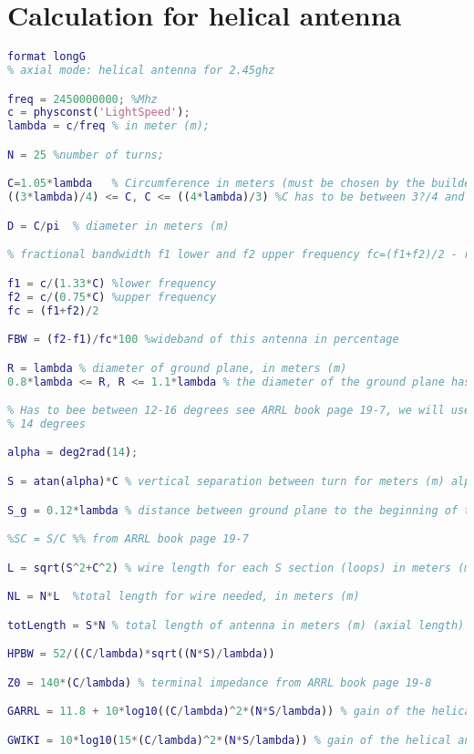 \chapter{Calculation for helical antenna}
\begin{lstlisting}[language=Matlab]
format longG
% axial mode: helical antenna for 2.45ghz

freq = 2450000000; %Mhz
c = physconst('LightSpeed');
lambda = c/freq % in meter (m);

N = 25 %number of turns;

C=1.05*lambda   % Circumference in meters (must be chosen by the builder of the antenna)
((3*lambda)/4) <= C, C <= ((4*lambda)/3) %C has to be between 3?/4 and 4?/3 for axial mode helical antenna

D = C/pi  % diameter in meters (m)

% fractional bandwidth f1 lower and f2 upper frequency fc=(f1+f2)/2 - read: http://www.antenna-theory.com/antennas/travelling/helix.php 

f1 = c/(1.33*C) %lower frequency
f2 = c/(0.75*C) %upper frequency
fc = (f1+f2)/2  

FBW = (f2-f1)/fc*100 %wideband of this antenna in percentage

R = lambda % diameter of ground plane, in meters (m)
0.8*lambda <= R, R <= 1.1*lambda % the diameter of the ground plane has to follow the two conditions. 

% Has to bee between 12-16 degrees see ARRL book page 19-7, we will use
% 14 degrees

alpha = deg2rad(14);

S = atan(alpha)*C % vertical separation between turn for meters (m) alpha = tan(S/C)

S_g = 0.12*lambda % distance between ground plane to the beginning of the helix's first turn, in meters (m)

%SC = S/C %% from ARRL book page 19-7

L = sqrt(S^2+C^2) % wire length for each S section (loops) in meters (m)

NL = N*L  %total length for wire needed, in meters (m)

totLength = S*N % total length of antenna in meters (m) (axial length)

HPBW = 52/((C/lambda)*sqrt((N*S)/lambda))

Z0 = 140*(C/lambda) % terminal impedance from ARRL book page 19-8

GARRL = 11.8 + 10*log10((C/lambda)^2*(N*S/lambda)) % gain of the helical antenna in dBi from ARRL book page 19-8

GWIKI = 10*log10(15*(C/lambda)^2*(N*S/lambda)) % gain of the helical antenna in dBi from wikipedia: https://en.wikipedia.org/wiki/Helical_antenna
\end{lstlisting}